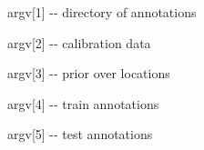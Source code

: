 \begin{DoxyItemize}
\item argv\mbox{[}1\mbox{]} -\/-\/ directory of annotations \item argv\mbox{[}2\mbox{]} -\/-\/ calibration data \item argv\mbox{[}3\mbox{]} -\/-\/ prior over locations \item argv\mbox{[}4\mbox{]} -\/-\/ train annotations \item argv\mbox{[}5\mbox{]} -\/-\/ test annotations \end{DoxyItemize}
